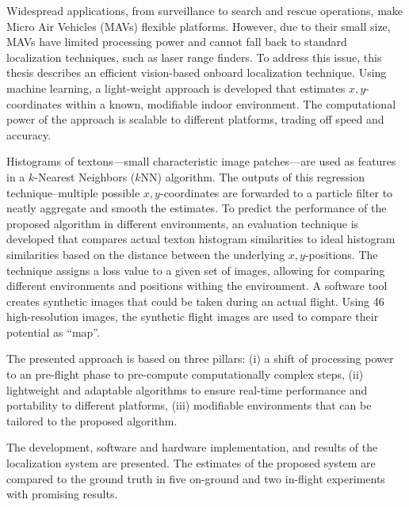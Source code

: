 Widespread applications, from surveillance to search and rescue operations, make Micro Air Vehicles (MAVs) flexible platforms.
However, due to their small size, MAVs have limited processing power and cannot
fall back to standard localization techniques, such as laser range finders. To address this
issue, this thesis describes an efficient vision-based onboard localization
technique. Using machine learning, a light-weight approach is developed that estimates $x,y$-coordinates within a known, modifiable indoor environment. The computational power of the approach is scalable to different platforms, trading off speed and accuracy.

Histograms of textons---small characteristic image patches---are used as features in a $k$-Nearest Neighbors ($k$NN) algorithm. The outputs of this regression technique--multiple possible
$x, y$-coordinates are forwarded to a particle filter to neatly aggregate
and smooth the estimates.
To predict the performance of the proposed algorithm in different environments, an evaluation
technique is developed that compares actual texton histogram similarities to
ideal histogram similarities based on the distance between the underlying
$x,y$-positions. The technique assigns a loss value to a given set of
images, allowing for comparing different environments and positions withing the environment. A software tool creates synthetic images
that could be taken during an actual flight. Using 46 high-resolution images, the synthetic flight images are used to compare their potential as ``map''.


The presented approach is based on three pillars: (i) a shift of processing power to an pre-flight phase to pre-compute
computationally complex steps, (ii) lightweight and adaptable algorithms to ensure real-time performance and portability to different platforms,
(iii) modifiable environments that can be tailored to the proposed algorithm. 

The development, software and hardware
implementation, and results of the localization system are presented.
The estimates of the proposed system are compared to the ground truth in five on-ground and two
in-flight experiments with promising results.